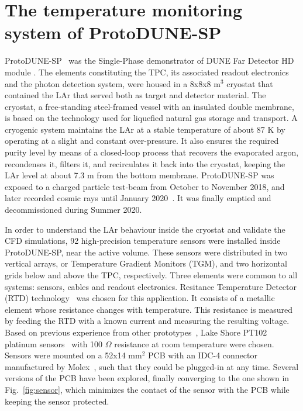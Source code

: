 \section{The temperature monitoring system of ProtoDUNE-SP}
\label{sec:protoDUNE}

\noindent ProtoDUNE-SP~\cite{pdsp_tdr} was the Single-Phase demonstrator of DUNE Far Detector HD module \cite{dune_tdr4}. %
The elements constituting the TPC, its associated readout electronics and the photon detection system, were housed in a 8x8x8 m$^3$ cryostat that contained the LAr that served both as target and detector material. The cryostat, a free-standing steel-framed vessel with an insulated double membrane, is based on the technology used for liquefied natural gas storage and transport. A cryogenic system maintains the LAr at a stable temperature of about 87 K by operating at a slight and constant over-pressure. It also ensures the required purity level by means of a closed-loop process that recovers the evaporated argon, recondenses it, filters it, and recirculates it back into the cryostat, keeping the LAr level at about 7.3 m from the bottom membrane. ProtoDUNE-SP was exposed to a charged particle test-beam from October to November 2018, and later recorded cosmic rays until January 2020~\cite{pdsp_1,pdsp_2}. It was finally emptied and decommissioned during Summer 2020.

In order to understand the LAr behaviour inside the cryostat and validate the CFD simulations, 92 high-precision temperature sensors were installed inside ProtoDUNE-SP, near the active volume. These sensors were distributed in two vertical arrays, or Temperature Gradient Monitors (TGM), and two horizontal grids below and above the TPC, respectively. Three elements were common to all systems: sensors, cables and readout electronics. Resitance Temperature Detector (RTD) technology~\cite{minco} was chosen for this application. It consists of a metallic element whose resistance changes with temperature. This resistance is measured by feeding the RTD with a known current and measuring the resulting voltage. Based on previous experience from other prototypes~\cite{35t_1}, Lake Shore PT102 platinum sensors~\cite{pt102} with 100 $\Omega$ resistance at room temperature were chosen. Sensors were mounted on a 52x14 mm$^2$ PCB with an IDC-4 connector manufactured by Molex~\cite{bib:idc4male,bib:idc4female}, such that they could be plugged-in at any time. Several versions of the PCB have been explored, finally converging to the one shown in Fig.~\ref{fig:sensor}, which minimizes the contact of the sensor with the PCB while keeping the sensor protected.

